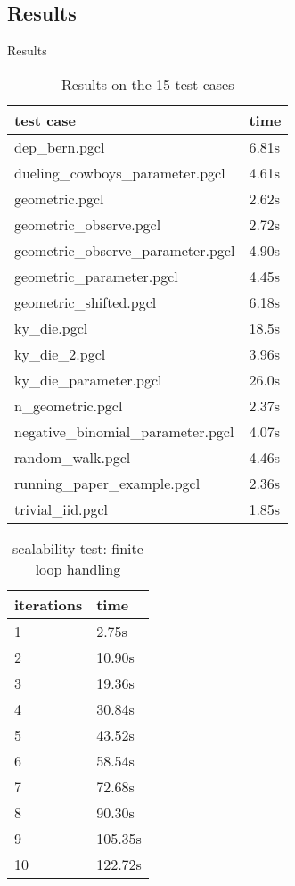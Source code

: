\documentclass[8pt]{beamer}
\begin{document}
\subsection{Results}
\begin{frame}[allowframebreaks]{Results}
	\begin{table}[htbp]
		\centering
		\caption{Results on the 15 test cases}
		\begin{tabular}{ll}
			\hline
			test case                        & time  \\
			\hline
			dep_bern.pgcl                    & 6.81s \\
			dueling_cowboys_parameter.pgcl   & 4.61s \\
			geometric.pgcl                   & 2.62s \\
			geometric_observe.pgcl           & 2.72s \\
			geometric_observe_parameter.pgcl & 4.90s \\
			geometric_parameter.pgcl         & 4.45s \\
			geometric_shifted.pgcl           & 6.18s \\
			ky_die.pgcl                      & 18.5s \\
			ky_die_2.pgcl                    & 3.96s \\
			ky_die_parameter.pgcl            & 26.0s \\
			n_geometric.pgcl                 & 2.37s \\
			negative_binomial_parameter.pgcl & 4.07s \\
			random_walk.pgcl                 & 4.46s \\
			running_paper_example.pgcl       & 2.36s \\
			trivial_iid.pgcl                 & 1.85s \\
			\hline
		\end{tabular}
	\end{table}

	\begin{table}[htbp]
		\centering
		\caption{scalability test: finite loop handling}
		\begin{tabular}{ll}
			\hline
			iterations & time    \\
			\hline
			1          & 2.75s   \\
			2          & 10.90s  \\
			3          & 19.36s  \\
			4          & 30.84s  \\
			5          & 43.52s  \\
			6          & 58.54s  \\
			7          & 72.68s  \\
			8          & 90.30s  \\
			9          & 105.35s \\
			10         & 122.72s \\
			\hline
		\end{tabular}
	\end{table}
\end{frame}
\end{document}
